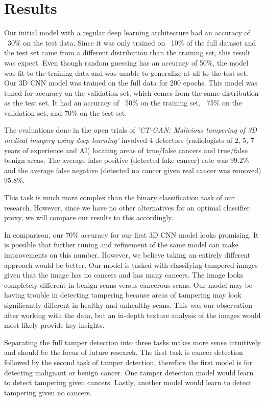 \documentclass[conference]{IEEEtran}
\begin{document}
\section{Results}
\par
Our initial model with a regular deep learning architecture had an accuracy of ~30\% on the test data. Since it was only trained on ~10\% of the full dataset and the test set came from a different distribution than the training set, this result was expect. Even though random guessing has an accuracy of 50\%, the model was fit to the training data and was unable to generalize at all to the test set.
Our 3D CNN model was trained on the full data for 200 epochs. This model was tuned for accuracy on the validation set, which comes from the same distribution as the test set. It had an accuracy of ~50\% on the training set, ~75\% on the validation set, and 70\% on the test set. 
\par
The evaluations done in the open trials of \textit{'CT-GAN: Malicious tampering of 3D medical imagery using deep learning'} involved 4 detectors (radiologists of 2, 5, 7 years of experience and AI) locating areas of true/false cancers and true/false benign areas. The average false positive (detected fake cancer) rate
was 99.2\% and the average false negative (detected no cancer given real cancer
was removed) 95.8\%.
\par
This task is much more complex than the binary classification task of our research. However, since we have no other alternatives for an optimal classifier proxy, we will compare our results to this accordingly. 
\par
In comparison, our 70\% accuracy for our first 3D CNN model looks promising. It is possible that further tuning and refinement of the same model can make improvements on this number. However, we believe taking an entirely different approach would be better. Our model is tasked with classifying tampered images given that the image has no cancers and has many cancers. The image looks completely different in benign scans versus cancerous scans. Our model may be having trouble in detecting tampering because areas of tampering may look significantly different in healthy and unhealthy scans. This was our observation after working with the data, but an in-depth texture analysis of the images would most likely provide key insights. 
\par
Separating the full tamper detection into three tasks makes more sense intuitively and should be the focus of future research. The first task is cancer detection followed by the second task of tamper detection, therefore the first model is for detecting malignant or benign cancer. One tamper detection model would learn to detect tampering given cancers. Lastly, another model would learn to detect tampering given no cancers. 
\end{document}
